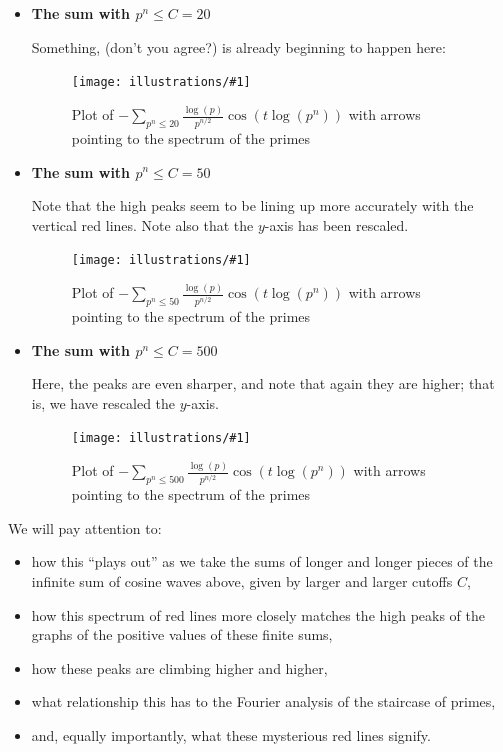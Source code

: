 \documentclass[openany]{book}
\newcommand{\ill}[3]{%
   \begin{figure}[H]%
   \vspace{-2ex}
   \centering%
   \texttt{[image: illustrations/\#1]}%
   \caption{#3}%
   \vspace{-2ex}
    \end{figure}}
\theoremstyle{plain}
\theoremstyle{definition}
\begin{document}
{{\begin{enumerate}
\begin{itemize}
Here is the function $f(t)$ we displayed above; it consists in the sum of the first four terms of our infinite sum, and doesn't yet show very much ``structure'':

\ill{phihat_even-5}{1}{Plot of $-\sum_{p^n\leq 5}{\frac{\log(p)}{p^{n/2}}}\cos(t\log(p^n))$ with
arrows pointing to the spectrum of the primes\label{fig:pnsum5}}

\vskip20pt
\item {\bf The sum with $p^n \le C=20$}

 Something,
 (don't you agree?)  is already beginning to happen here:
\ill{phihat_even-20}{1}{Plot of $-\sum_{p^n\leq 20}{\frac{\log(p)}{p^{n/2}}}\cos(t\log(p^n))$ with arrows pointing to the spectrum of the primes}\vskip20pt
\item {\bf The sum with $p^n \le C=50$}

  Note that the high peaks seem to be lining up more accurately with
  the vertical red lines. Note also that the $y$-axis has been
  rescaled.

\ill{phihat_even-50}{1}{Plot of $-\sum_{p^n\leq 50}{\frac{\log(p)}{p^{n/2}}}\cos(t\log(p^n))$ with arrows pointing to the spectrum of the primes}\vskip20pt
\item {\bf The sum with $p^n \le C=500$}

  Here, the peaks are even sharper, and note that again they are
  higher; that is, we have rescaled the $y$-axis.
  \ill{phihat_even-500}{1}{Plot of $-\sum_{p^n\leq
      500}{\frac{\log(p)}{p^{n/2}}}\cos(t\log(p^n))$ with arrows
    pointing to the spectrum of the primes\label{fig:pnsum500}}
\end{itemize}

  We will pay attention to:

\begin{itemize}
\item how this ``plays out'' as we take the sums of longer and longer
  pieces of the infinite sum of cosine waves above, given by larger
  and larger cutoffs $C$,
\item how this spectrum of red lines more closely matches the high
  peaks of the graphs of the positive values of these finite sums,
\item how these peaks are climbing higher and higher,
\item what relationship this has to the Fourier analysis of the
  staircase of primes,
\item and, equally importantly, what these mysterious red lines
  signify.
\end{itemize}


\end{enumerate}}}
\end{document}
